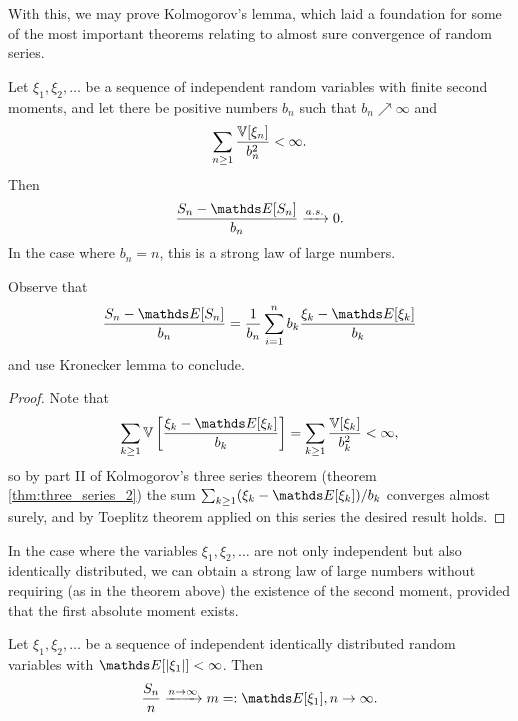 With this, we may prove Kolmogorov's lemma, which laid a foundation for some of the most important theorems relating to almost sure convergence of random series.

\begin{theorem}[Kolmogorov]
Let $\xi_1, \xi_2,\dots$ be a sequence of independent random
variables with finite second moments, and let there be positive numbers $b_n$ such that $b_n \nearrow \infty$ and 
\begin{equation*}
    \sum_{n\geq 1} \frac{\mathbb{V}[\xi_n]}{b_n^2} < \infty.
\end{equation*}
Then 
\begin{equation*}
    \frac{S_n - \E[S_n]}{b_n} \xrightarrow{a.s.} 0.
\end{equation*}
In the case where $b_n = n$, this is a strong law of large numbers.
\end{theorem}

\begin{hint}
Observe that 
\begin{equation*}
\frac{S_n - \E[S_n]}{b_n} = \frac{1}{b_n} \sum_{i=1}^n b_k \frac{\xi_k - \E[\xi_k]}{b_k}
\end{equation*}
and use Kronecker lemma to conclude.
\end{hint}

\begin{proof}
Note that 
\begin{equation*}
\sum_{k\geq 1} \V\sqbracket{\frac{\xi_k - \E[\xi_k]}{b_k}} = \sum_{k\geq 1} \frac{\V[\xi_k]}{b_k^2} < \infty,
\end{equation*}
so by part II of Kolmogorov's three series theorem (theorem \ref{thm:three_series_2}) the sum $\sum_{k\geq 1} (\xi_k - \E[\xi_k])/b_k$ converges almost surely, and by Toeplitz theorem applied on this series the desired result holds.
\end{proof}

In the case where the variables $\xi_1, \xi_2, \dots$ are not only independent but also identically distributed, we can obtain a strong law of large numbers without requiring (as in the theorem above) the existence of the second moment, provided that the first absolute moment exists.
\begin{theorem}
Let $\xi_1, \xi_2, \dots$ be a sequence of independent identically distributed random variables with $\E[|\xi_1|]<\infty$. Then
\begin{equation*}
    \frac{S_n}{n} \xrightarrow{n\to\infty} m =: \E[\xi_1], n \to \infty.
\end{equation*}
\end{theorem}


